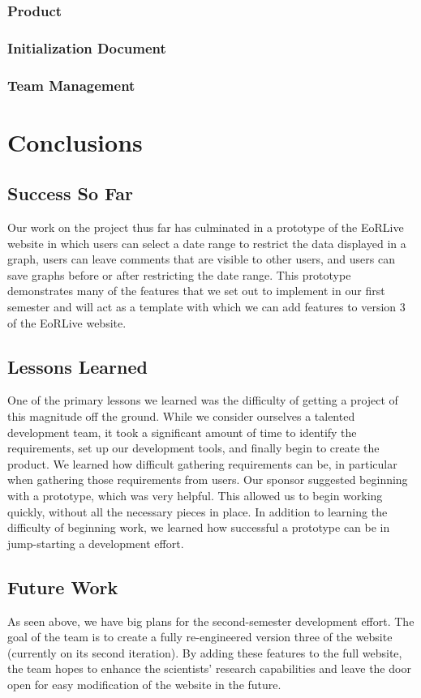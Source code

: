 \documentclass[12pt]{article}
\begin{document}
\begin{spacing}{1.5}
\subsubsection{Product}
\subsubsection{Initialization Document}
\subsubsection{Team Management}

\clearpage

\section{Conclusions}
\subsection{Success So Far}
Our work on the project thus far has culminated in a prototype of the EoRLive website in which users can select a date range to restrict the data displayed in a graph, users can leave comments that are visible to other users, and users can save graphs before or after restricting the date range. This prototype demonstrates many of the features that we set out to implement in our first semester and will act as a template with which we can add features to version 3 of the EoRLive website.
\subsection{Lessons Learned}
One of the primary lessons we learned was the difficulty of getting a project of this magnitude off the ground. While we consider ourselves a talented development team, it took a significant amount of time to identify the requirements, set up our development tools, and finally begin to create the product. We learned how difficult gathering requirements can be, in particular when gathering those requirements from users. Our sponsor suggested beginning with a prototype, which was very helpful. This allowed us to begin working quickly, without all the necessary pieces in place. In addition to learning the difficulty of beginning work, we learned how successful a prototype can be in jump-starting a development effort.
\subsection{Future Work}
As seen above, we have big plans for the second-semester development effort. The goal of the team is to create a fully re-engineered version three of the website (currently on its second iteration). By adding these features to the full website, the team hopes to enhance the scientists' research capabilities and leave the door open for easy modification of the website in the future.

\end{spacing}
\end{document}
